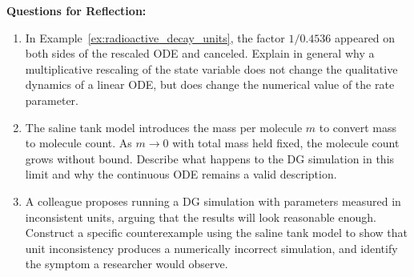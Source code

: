 \noindent \textup{{\bf Questions for Reflection:}}
\begin{enumerate}
\item In Example~\ref{ex:radioactive_decay_units}, the factor $1/0.4536$ appeared on both sides of the rescaled ODE and canceled. Explain in general why a multiplicative rescaling of the state variable does not change the qualitative dynamics of a linear ODE, but does change the numerical value of the rate parameter.

\item The saline tank model introduces the mass per molecule $m$ to convert mass to molecule count. As $m \to 0$ with total mass held fixed, the molecule count grows without bound. Describe what happens to the DG simulation in this limit and why the continuous ODE remains a valid description.

\item A colleague proposes running a DG simulation with parameters measured in inconsistent units, arguing that the results will look reasonable enough. Construct a specific counterexample using the saline tank model to show that unit inconsistency produces a numerically incorrect simulation, and identify the symptom a researcher would observe.
\end{enumerate}
